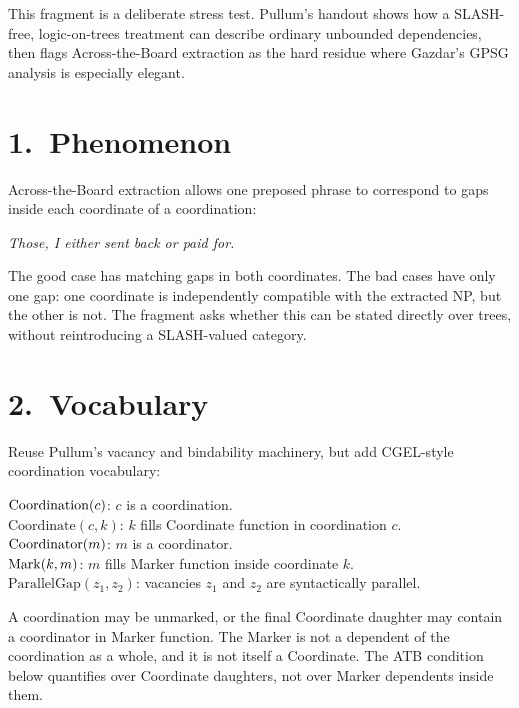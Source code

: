 \documentclass[11pt]{article}
\newcommand{\Coordination}{\Cat{Coordination}}
\newcommand{\Coordinate}{\mathrm{Coordinate}}
\newcommand{\Coordinator}{\Cat{Coordinator}}
\newcommand{\ParallelGap}{\mathrm{ParallelGap}}
\begin{document}
\fragmenthead

\noindent
This fragment is a deliberate stress test. Pullum's handout shows how a
SLASH-free, logic-on-trees treatment can describe ordinary unbounded
dependencies, then flags Across-the-Board extraction as the hard residue where
Gazdar's GPSG analysis is especially elegant.

\section*{1.~Phenomenon}

Across-the-Board extraction allows one preposed phrase to correspond to gaps
inside each coordinate of a coordination:

\ea
\textit{Those, I either sent back or paid for.}
\z

\ea
{}
\z

\ea
{}
\z

The good case has matching gaps in both coordinates. The bad cases have only
one gap: one coordinate is independently compatible with the extracted NP, but
the other is not. The fragment asks whether this can be stated directly over
trees, without reintroducing a SLASH-valued category.

\section*{2.~Vocabulary}

Reuse Pullum's vacancy and bindability machinery, but add CGEL-style
coordination vocabulary:

\ea
$\Coordination(c)$: $c$ is a coordination.\\
$\Coordinate(c,k)$: $k$ fills Coordinate function in coordination $c$.\\
$\Coordinator(m)$: $m$ is a coordinator.\\
$\mathrm{Mark}(k,m)$: $m$ fills Marker function inside coordinate $k$.\\
$\ParallelGap(z_1,z_2)$: vacancies $z_1$ and $z_2$ are syntactically parallel.
\z

A coordination may be unmarked, or the final Coordinate daughter may contain a
coordinator in Marker function. The Marker is not a dependent of the
coordination as a whole, and it is not itself a Coordinate. The ATB condition
below quantifies over Coordinate daughters, not over Marker dependents inside
them.
\end{document}
